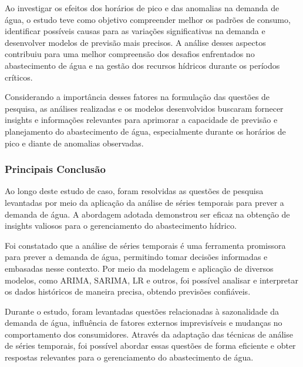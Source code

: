 Ao investigar os efeitos dos horários de pico e das anomalias na demanda de água, o estudo teve como objetivo compreender melhor os padrões de consumo, identificar possíveis causas para as variações significativas na demanda e desenvolver modelos de previsão mais precisos. A análise desses aspectos contribuiu para uma melhor compreensão dos desafios enfrentados no abastecimento de água e na gestão dos recursos hídricos durante os períodos críticos.

Considerando a importância desses fatores na formulação das questões de pesquisa, as análises realizadas e os modelos desenvolvidos buscaram fornecer insights e informações relevantes para aprimorar a capacidade de previsão e planejamento do abastecimento de água, especialmente durante os horários de pico e diante de anomalias observadas.

\subsubsection{Principais Conclus\~ao}

Ao longo deste estudo de caso, foram resolvidas as questões de pesquisa levantadas por meio da aplicação da análise de séries temporais para prever a demanda de água. A abordagem adotada demonstrou ser eficaz na obtenção de insights valiosos para o gerenciamento do abastecimento hídrico.

Foi constatado que a análise de séries temporais é uma ferramenta promissora para prever a demanda de água, permitindo tomar decisões informadas e embasadas nesse contexto. Por meio da modelagem e aplicação de diversos modelos, como ARIMA, SARIMA, LR e outros, foi possível analisar e interpretar os dados históricos de maneira precisa, obtendo previsões confiáveis.

Durante o estudo, foram levantadas questões relacionadas à sazonalidade da demanda de água, influência de fatores externos imprevisíveis e mudanças no comportamento dos consumidores. Através da adaptação das técnicas de análise de séries temporais, foi possível abordar essas questões de forma eficiente e obter respostas relevantes para o gerenciamento do abastecimento de água.

